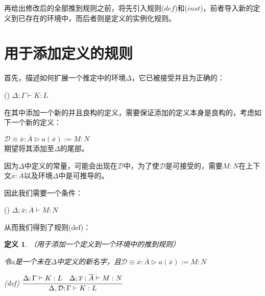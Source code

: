 \documentclass[UTF8]{article}
\newtheorem{thm}{定义}[section]
\newcommand{\rmnum}[1]{\romannumeral #1}
\begin{document}
		再给出修改后的全部推到规则之前，将先引入规则($def$)和($inst$)，前者导入新的定义到已存在的环境中，而后者则是定义的实例化规则。
		
	\section{用于添加定义的规则}
	\noindent
	首先，描述如何扩展一个推定中的环境$\Delta$，它已被接受并且为正确的：
	
		(\rmnum{1}) $\Delta;\Gamma\vdash K:L$
		
		在其中添加一个新的并且良构的定义，需要保证添加的定义本身是良构的，考虑如下一个新的定义：
		
		$\mathcal{D}\equiv\overline{x}:\overline{A}\triangleright a(\overline{x}):=M:N$\\
		期望将其添加至$\Delta$的尾部。
		
		因为$\Delta$中定义的常量，可能会出现在$\mathcal{D}$中，为了使$\mathcal{D}$是可接受的，需要$M:N$在上下文$\overline{x}:\overline{A}$以及环境$\Delta$中是可推导的。
		
		因此我们需要一个条件：
		
		(\rmnum{2}) $\Delta;\overline{x}:\overline{A}\vdash M:N$
		
		从而我们得到了规则(def)：
		
		\begin{thm}（用于添加一个定义到一个环境中的推到规则）
			
			\noindent
			令$a$是一个未在$\Delta$中定义的新名字，且$\mathcal{D}\equiv\overline{x}:\overline{A}\triangleright a(\overline{x}):=M:N$
			
			(def) $\cfrac{\Delta;\Gamma\vdash K:L\ \ \ \Delta;\overline{x}:\overline{A}\vdash M:N}{\Delta,\mathcal{D};\Gamma\vdash K:L}$
		\end{thm}
\end{document}

